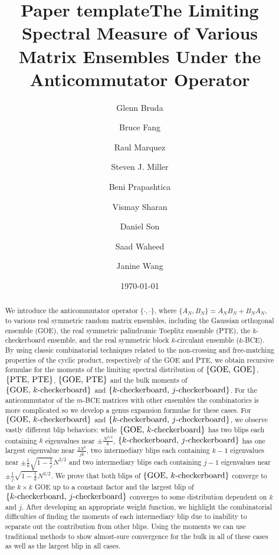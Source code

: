 \documentclass[11pt,reqno]{amsart}
\title{Paper template}
\author{Glenn Bruda}
\author{Bruce Fang}
\author{Raul Marquez}
\author{Steven J. Miller}
\author{Beni Prapashtica}
\author{Vismay Sharan}
\author{Daniel Son}
\author{Saad Waheed}
\author{Janine Wang}
\date{\today}
\title{The Limiting Spectral Measure of Various Matrix Ensembles Under the Anticommutator Operator}
\numberwithin{equation}{section}
\theoremstyle{plain}
\begin{document}
\begin{abstract}
We introduce the anticommutator operator $\{\cdot, \cdot\}$, where $\{A_N,B_N\} = A_NB_N + B_NA_N$, to various real symmetric random matrix ensembles, including the Gaussian orthogonal ensemble (GOE), the real symmetric palindromic Toeplitz ensemble (PTE), the $k$-checkerboard ensemble, and the real symmetric block $k$-circulant ensemble ($k$-BCE). By using classic combinatorial techniques related to the non-crossing and free-matching properties of the cyclic product, respectively of the GOE and PTE, we obtain recursive formulae for the moments of the limiting spectral distribution of $\{\textup{GOE, GOE}\}$, $\{\textup{PTE, PTE}\}$, $\{\textup{GOE, PTE}\}$ and the bulk moments of $\{\textup{GOE, }k\textup{-checkerboard}\}$ and $\{k\textup{-checkerboard, }j\textup{-checkerboard}\}$. For the anticommutator of the $m$-BCE matrices with other ensembles the combinatorics is more complicated so we develop a genus expansion formulae for these cases. For $\{\textup{GOE, }k\textup{-checkerboard}\}$ and $\{k\textup{-checkerboard, }j\textup{-checkerboard}\}$, we observe vastly different blip behaviors: while $\{\textup{GOE, }k\textup{-checkerboard}\}$ has two blips each containing $k$ eigenvalues near $\pm\frac{N^{3/2}}{k}$, $\{k\textup{-checkerboard, }j\textup{-checkerboard}\}$ has one largest eigenvalue near $\frac{2N^2}{jk}$, two intermediary blips each containing $k-1$ eigenvalues near $\pm \frac{1}{k}\sqrt{1-\frac{1}{j}}N^{3/2}$ and two intermediary blips each containing $j-1$ eigenvalues near $\pm\frac{1}{j}\sqrt{1-\frac{1}{k}}N^{3/2}$. We prove that both blips of $\{\textup{GOE, }k\textup{-checkerboard}\}$ converge to the $k\times k$ GOE up to a constant factor and the largest blip of $\{k\textup{-checkerboard, }j\textup{-checkerboard}\}$ converges to some distribution dependent on $k$ and $j$. After developing an appropriate weight function, we highlight the combinatorial difficulties of finding the moments of each intermediary blip due to inability to separate out the contribution from other blips. Using the moments we can use traditional methods to show almost-sure convergence for the bulk in all of these cases as well as the largest blip in all cases.
\end{abstract}

\maketitle

\tableofcontents
\end{document}
